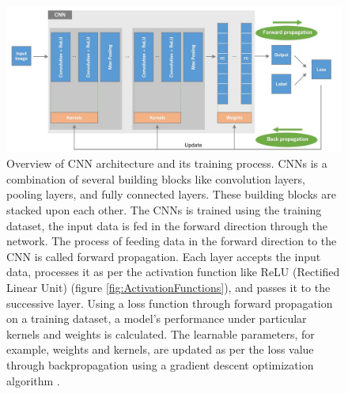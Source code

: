 \vspace*{0.3cm}
\begin{figure}[H]
        \begin{center}
	    \includegraphics[scale=0.59]{images/Fundamentals/CNNBuildingBlocks.JPG}
	    \caption[Overview of \ac{CNN} architecture and its training process.]{Overview of \ac{CNN} architecture and its training process. \acp{CNN} is a combination of several building blocks like convolution layers, pooling layers, and fully connected layers. These building blocks are stacked upon each other. The \acp{CNN} is trained using the training dataset, the input data is fed in the forward direction through the network. The process of feeding data in the forward direction to the \ac{CNN} is called forward propagation. Each layer accepts the input data, processes it as per the activation function like ReLU (Rectified Linear Unit) (figure \ref{fig:ActivationFunctions}), and passes it to the successive layer. Using a loss function through forward propagation on a training dataset, a model’s performance under particular kernels and weights is calculated. The learnable parameters, for example, weights and kernels, are updated as per the loss value through backpropagation using a gradient descent optimization algorithm \cite{ruder2017overview}.}
	    \label{fig:CNNBuildingBlocks}
	    \end{center}
\end{figure}





